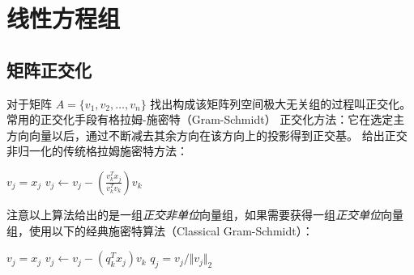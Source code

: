 \chapter[short]{线性方程组}

\section{矩阵正交化}
对于矩阵 $A=\{v_1,v_2,\dots,v_n\}$ 找出构成该矩阵列空间极大无关组的过程叫正交化。常用的正交化手段有格拉姆-施密特（Gram-Schmidt）
正交化方法：它在选定主方向向量以后，通过不断减去其余方向在该方向上的投影得到正交基。
给出正交非归一化的传统格拉姆施密特方法：
\begin{center}
    \begin{minipage}{.7\linewidth}
        \begin{algorithm}[H]
            \caption{}
            {
                $v_j=x_j$\;
                {
                    $v_j\leftarrow v_j-(\frac{v_k^Tx_j}{v_k^Tv_k})v_k$\;
                }
            }
        \end{algorithm}
    \end{minipage}
\end{center}
注意以上算法给出的是一组\emph{正交非单位}向量组，如果需要获得一组\emph{正交单位}向量组，使用以下的经典施密特算法（Classical Gram-Schmidt）：
\begin{center}
    \begin{minipage}{.7\linewidth}
        \begin{algorithm}[H]
            \caption{}
            {
                $v_j=x_j$\;
                {
                    $v_j\leftarrow v_j-(q_k^Tx_j)v_k$\;
                }
                $q_j=v_j/\Vert v_j\Vert_2$\;
            }
        \end{algorithm}
    \end{minipage}
\end{center}

